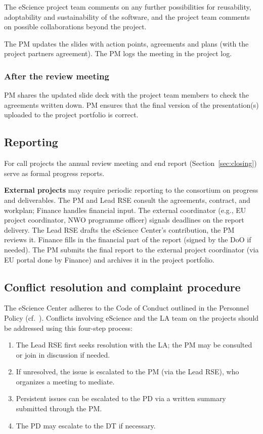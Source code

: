 The eScience project team comments on any further possibilities for reusability, adoptability and sustainability of the
software, and the project team comments on possible collaborations beyond the project.

The PM updates the slides with action points, agreements and plans (with the project partners agreement). The PM logs
the meeting in the project log.

\subsubsection{After the review meeting}
PM shares the updated slide deck with the project team members to check the agreements written down. PM ensures that the
final version of the presentation(s) uploaded to the project portfolio is correct.

\subsection{Reporting}
\label{sec:exec:report}
For call projects the annual review meeting and end report (Section~\ref{sec:closing}) serve as formal progress reports.

\textbf{External projects} may require periodic reporting to the consortium on progress and deliverables. 
The PM and Lead RSE consult the agreements, contract, and workplan; Finance handles financial input. 
The external coordinator (e.g., EU project coordinator, NWO programme officer) signals deadlines on the report delivery. 
The Lead RSE drafts the eScience Center's contribution, the PM reviews it. Finance fills in the financial part of the report 
(signed by the DoO if needed). The PM submits the final report to the external project coordinator 
(via EU portal done by Finance) and archives it in the project portfolio.

\subsection{Conflict resolution and complaint procedure}
The eScience Center adheres to the Code of Conduct outlined in the Personnel Policy (cf.~\cite{cao}). 
%
Conflicts involving eScience and the LA team on the projects should be addressed using this four-step process:
\begin{enumerate}\itemsep0em
\item The Lead RSE first seeks resolution with the LA; the PM may be consulted or join in discussion if needed.
\item If unresolved, the issue is escalated to the PM (via the Lead RSE), who organizes a meeting to mediate.
\item Persistent issues can be escalated to the PD via a written summary submitted through the PM.
\item The PD may escalate to the DT if necessary.
\end{enumerate}

